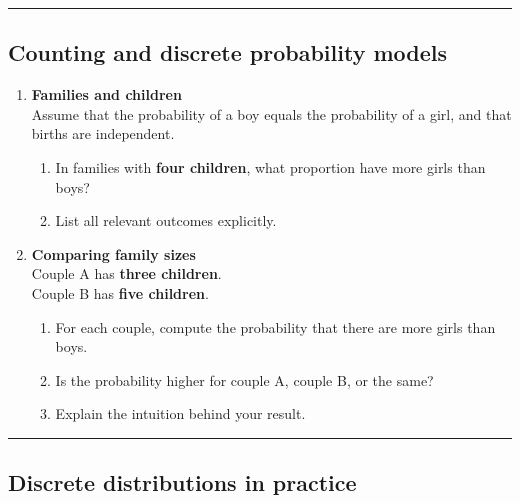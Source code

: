 \documentclass[
  letterpaper,
  DIV=11,
  numbers=noendperiod]{scrreprt}
\providecommand{\tightlist}{%
  \setlength{\itemsep}{0pt}\setlength{\parskip}{0pt}}
\begin{document}
\begin{center}\rule{0.5\linewidth}{0.5pt}\end{center}

\subsection{Counting and discrete probability
models}\label{counting-and-discrete-probability-models}

\begin{enumerate}
\def\labelenumi{\arabic{enumi}.}
\setcounter{enumi}{6}
\item
  \textbf{Families and children}\\
  Assume that the probability of a boy equals the probability of a girl,
  and that births are independent.

  \begin{enumerate}
  \def\labelenumii{(\alph{enumii})}
  \tightlist
  \item
    In families with \textbf{four children}, what proportion have more
    girls than boys?\\
  \item
    List all relevant outcomes explicitly.
  \end{enumerate}
\item
  \textbf{Comparing family sizes}\\
  Couple A has \textbf{three children}.\\
  Couple B has \textbf{five children}.

  \begin{enumerate}
  \def\labelenumii{(\alph{enumii})}
  \tightlist
  \item
    For each couple, compute the probability that there are more girls
    than boys.\\
  \item
    Is the probability higher for couple A, couple B, or the same?\\
  \item
    Explain the intuition behind your result.
  \end{enumerate}
\end{enumerate}

\begin{center}\rule{0.5\linewidth}{0.5pt}\end{center}

\subsection{Discrete distributions in
practice}\label{discrete-distributions-in-practice}
\end{document}
